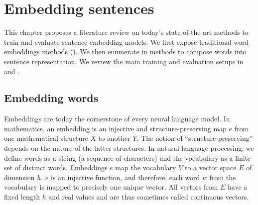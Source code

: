 \setchapterpreamble[u]{\margintoc}
\chapter{Embedding sentences}



This chapter proposes a literature review on today's state-of-the-art methods to train and evaluate sentence embedding models. We first expose traditional word embeddings methods (). We then enumerate in  methods to compose words into sentence representation. We review the main training and evaluation setups in  and .

\section{Embedding words}

Embeddings are today the cornerstone of every neural language model. In mathematics, an embedding is an injective and structure-preserving map $e$ from one mathematical structure $X$ to another $Y$. The notion of “structure-preserving” depends on the nature of the latter structures. In natural language processing, we define words as a string (a sequence of characters) and the vocabulary as a finite set of distinct words. Embeddings $e$ map the vocabulary $V$ to a vector space $E$ of dimension $h$. $e$ is an injective function, and therefore, each word $w$ from the vocabulary is mapped to precisely one unique vector. All vectors from $E$ have a fixed length $h$ and real values and are thus sometimes called continuous vectors. 

